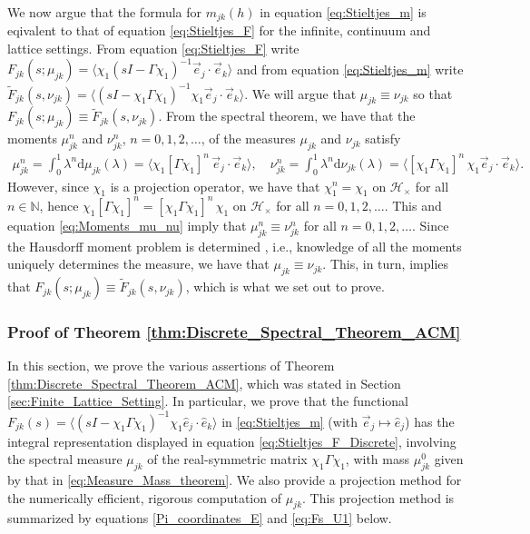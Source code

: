 \documentclass{cmslatex}
\renewcommand{\d}{\text{d}}
\begin{document}
We now argue that the formula for $m_{jk}(h)$ in equation
\eqref{eq:Stieltjes_m} is eqivalent to that of equation
\eqref{eq:Stieltjes_F} for the infinite, continuum and lattice
settings. From equation \eqref{eq:Stieltjes_F} write 
$F_{jk}(s;\mu_{jk})=\langle\chi_1(sI-\Gamma\chi_1)^{-1}\vec{e}_j\cdot\vec{e}_k\rangle$ and from equation
\eqref{eq:Stieltjes_m} write
$\tilde{F}_{jk}(s,\nu_{jk})=\langle(sI-\chi_1\Gamma\chi_1)^{-1}\chi_1\vec{e}_j\cdot\vec{e}_k\rangle$. We will
argue that $\mu_{jk}\equiv\nu_{jk}$ so that
$F_{jk}(s;\mu_{jk})\equiv\tilde{F}_{jk}(s,\nu_{jk})$. From the spectral
theorem, we have that the moments $\mu^n_{jk}$ and $\nu^n_{jk}$,
$n=0,1,2,\ldots$, of the measures $\mu_{jk}$ and $\nu_{jk}$ satisfy 
%
\begin{align}\label{eq:Moments_mu_nu}
   \mu_{jk}^n=\int_0^1\lambda^n\d\mu_{jk}(\lambda)=\langle\chi_1[\Gamma\chi_1]^n\,\vec{e}_j\cdot\vec{e}_k\rangle, \quad
   \nu_{jk}^n=\int_0^1\lambda^n\d\nu_{jk}(\lambda)=\langle[\chi_1\Gamma\chi_1]^n\,\chi_1\vec{e}_j\cdot\vec{e}_k\rangle.
\end{align}
%
However, since $\chi_1$ is a projection operator, we have that
$\chi_1^n=\chi_1$ on $\mathscr{H}_\times$ for all $n\in\mathbb{N}$, hence
$\chi_1[\Gamma\chi_1]^n=[\chi_1\Gamma\chi_1]^n\,\chi_1$ on $\mathscr{H}_\times$ for all
$n=0,1,2,\ldots$. This and equation \eqref{eq:Moments_mu_nu} imply that
$\mu^n_{jk}\equiv\nu^n_{jk}$  for all $n=0,1,2,\ldots$. Since the Hausdorff moment
problem is determined \cite{Shohat:1963}, i.e., knowledge of all the
moments uniquely determines the measure, we have that
$\mu_{jk}\equiv\nu_{jk}$. This, in turn, implies that
$F_{jk}(s;\mu_{jk})\equiv\tilde{F}_{jk}(s,\nu_{jk})$, which is what we set out to prove.






\subsubsection{Proof of Theorem
  \ref{thm:Discrete_Spectral_Theorem_ACM}}
\label{sec:Theorem_Proof}
%
In this section, we prove the various assertions of Theorem
\ref{thm:Discrete_Spectral_Theorem_ACM}, which was stated in Section
\ref{sec:Finite_Lattice_Setting}. In particular, we prove that the functional
$F_{jk}(s)=\langle(sI-\chi_1\Gamma\chi_1)^{-1}\chi_1\hat{e}_j\cdot\hat{e}_k\rangle$ in
\eqref{eq:Stieltjes_m} (with
$\vec{e}_j\mapsto\hat{e}_j$) has the integral representation displayed in
equation \eqref{eq:Stieltjes_F_Discrete}, involving the spectral
measure $\mu_{jk}$ of the real-symmetric matrix $\chi_1\Gamma\chi_1$, with mass
$\mu^0_{jk}$ given by that in \eqref{eq:Measure_Mass_theorem}. We also provide a
projection method for the numerically efficient, rigorous computation of
$\mu_{jk}$. This projection method is summarized by equations
\eqref{Pi_coordinates_E} and \eqref{eq:Fs_U1} below.   
\end{document}
